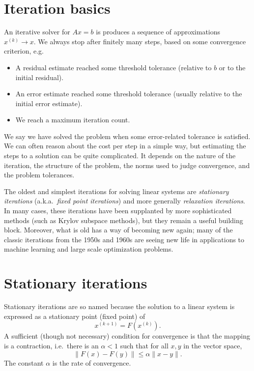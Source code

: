 \documentclass[12pt, leqno]{article} %
\begin{document}

\section{Iteration basics}

An iterative solver for $Ax = b$ is produces a sequence of
approximations $x^{(k)} \rightarrow x$.  We always stop after
finitely many steps, based on some convergence criterion, e.g.
\begin{itemize}
\item A residual estimate reached some threshold tolerance
  (relative to $b$ or to the initial residual).
\item An error estimate reached some threshold tolerance
  (usually relative to the initial error estimate).
\item We reach a maximum iteration count.
\end{itemize}
We say we have solved the problem when some error-related tolerance
is satisfied.  We can often reason about the cost per step in a
simple way, but estimating the steps to a solution can be
quite complicated.  It depends on the nature of the iteration, the
structure of the problem, the norms used to judge convergence, and
the problem tolerances.

The oldest and simplest iterations for solving linear systems are
{\em stationary iterations} (a.k.a.~{\em fixed point iterations})
and more generally {\em relaxation iterations}.
In many cases, these iterations have been supplanted by more
sophisticated methods (such as Krylov subspace methods), but they
remain a useful building block.  Moreover, what is old has a way of
becoming new again; many of the classic iterations from the 1950s
and 1960s are seeing new life in applications to machine learning
and large scale optimization problems.

\section{Stationary iterations}

Stationary iterations are so named because the solution to a linear
system is expressed as a stationary point (fixed point) of
\[
  x^{(k+1)} = F(x^{(k)}).
\]
A sufficient (though not necessary) condition for convergence is that
the mapping is a contraction, i.e.~there is an $\alpha < 1$ such that
for all $x, y$ in the vector space,
\[
  \|F(x)-F(y)\| \leq \alpha \|x-y\|.
\]
The constant $\alpha$ is the rate of convergence.
\end{document}
